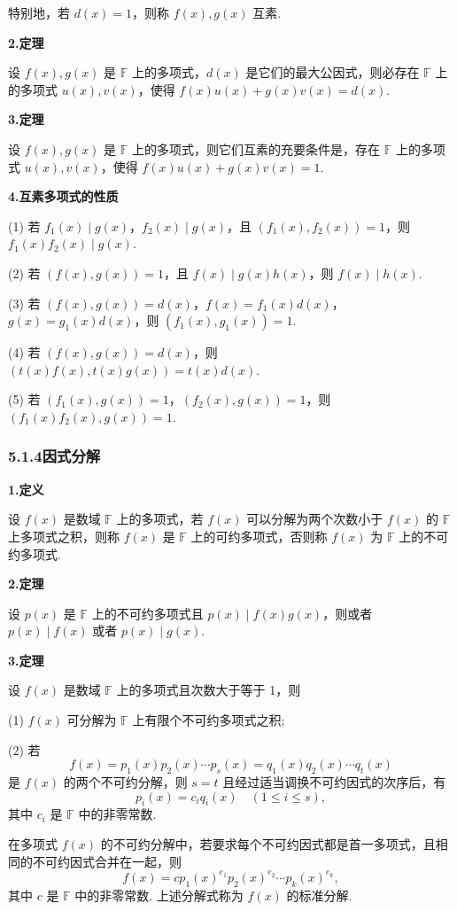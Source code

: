 \documentclass[UTF8,12pt,a4paper,fontset=fandol]{ctexart}
\begin{document}
特别地，若 $d(x)=1$，则称 $f(x),g(x)$ 互素.

\noindent\textbf{2.\quad 定理}

设 $f(x),g(x)$ 是 $\mathbb{F}$ 上的多项式，$d(x)$ 是它们的最大公因式，则必存在 $\mathbb{F}$ 上的多项式 $u(x),v(x)$，使得 $f(x)u(x)+g(x)v(x)=d(x)$.

\noindent\textbf{3.\quad 定理}

设 $f(x),g(x)$ 是 $\mathbb{F}$ 上的多项式，则它们互素的充要条件是，存在 $\mathbb{F}$ 上的多项式 $u(x),v(x)$，使得 $f(x)u(x)+g(x)v(x)=1$.

\noindent\textbf{4.\quad 互素多项式的性质}

(1) 若 $f_1(x)\mid g(x)$，$f_2(x)\mid g(x)$，且 $(f_1(x),f_2(x))=1$，则 $f_1(x)f_2(x)\mid g(x)$.

(2) 若 $(f(x),g(x))=1$，且 $f(x)\mid g(x)h(x)$，则 $f(x)\mid h(x)$.

(3) 若 $(f(x),g(x))=d(x)$，$f(x)=f_1(x)d(x)$，$g(x)=g_1(x)d(x)$，则 $(f_1(x),g_1(x))=1$.

(4) 若 $(f(x),g(x))=d(x)$，则 $(t(x)f(x),t(x)g(x))=t(x)d(x)$.

(5) 若 $(f_1(x),g(x))=1$，$(f_2(x),g(x))=1$，则 $(f_1(x)f_2(x),g(x))=1$.

\subsubsection*{5.1.4\quad 因式分解}

\noindent\textbf{1.\quad 定义}

设 $f(x)$ 是数域 $\mathbb{F}$ 上的多项式，若 $f(x)$ 可以分解为两个次数小于 $f(x)$ 的 $\mathbb{F}$ 上多项式之积，则称 $f(x)$ 是 $\mathbb{F}$ 上的可约多项式，否则称 $f(x)$ 为 $\mathbb{F}$ 上的不可约多项式.

\noindent\textbf{2.\quad 定理}

设 $p(x)$ 是 $\mathbb{F}$ 上的不可约多项式且 $p(x)\mid f(x)g(x)$，则或者 $p(x)\mid f(x)$ 或者 $p(x)\mid g(x)$.

\noindent\textbf{3.\quad 定理}

设 $f(x)$ 是数域 $\mathbb{F}$ 上的多项式且次数大于等于 1，则

(1) $f(x)$ 可分解为 $\mathbb{F}$ 上有限个不可约多项式之积;

(2) 若
\[
f(x)=p_1(x)p_2(x)\cdots p_s(x)=q_1(x)q_2(x)\cdots q_t(x)
\]
是 $f(x)$ 的两个不可约分解，则 $s=t$ 且经过适当调换不可约因式的次序后，有
\[
p_i(x)=c_iq_i(x)\quad (1\le i\le s),
\]
其中 $c_i$ 是 $\mathbb{F}$ 中的非零常数.

在多项式 $f(x)$ 的不可约分解中，若要求每个不可约因式都是首一多项式，且相同的不可约因式合并在一起，则
\[
f(x)=cp_1(x)^{e_1}p_2(x)^{e_2}\cdots p_k(x)^{e_k},
\]
其中 $c$ 是 $\mathbb{F}$ 中的非零常数. 上述分解式称为 $f(x)$ 的标准分解.
\end{document}
